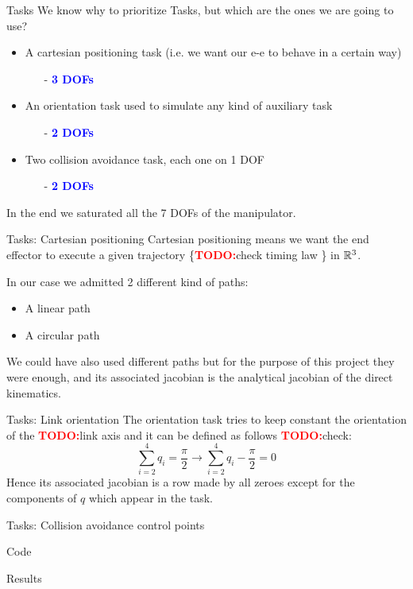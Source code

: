 \documentclass[11pt]{beamer}
\newcommand{\todo}{\textcolor{red}{\textbf{TODO:}}}
\newcommand{\dof}[1]{\begin{itemize}
\item[-]\textcolor{blue}{\textbf{#1 DOFs}}
\end{itemize}}
\begin{document}
\begin{frame}{Tasks}
We know why to prioritize Tasks, but which are the ones we are going to use?
\begin{itemize}
\item A cartesian positioning task (i.e. we want our e-e to behave in a certain way)
\dof{3}
\item An orientation task used to simulate any kind of auxiliary task
\dof{2}
\item Two collision avoidance task, each one on 1 DOF
\dof{2}
\end{itemize}
In the end we saturated all the 7 DOFs of the manipulator.
\end{frame}

\begin{frame}{Tasks: Cartesian positioning}
Cartesian positioning means we want the end effector to execute a given trajectory \{\todo check timing law \} in $\Bbb R^3$.

In our case we admitted 2 different kind of paths:
\begin{itemize}
\item A linear path
\item A circular path 
\end{itemize}

We could have also used different paths but for the purpose of this project they were enough, and its associated jacobian is the analytical jacobian of the direct kinematics.
\end{frame}

\begin{frame}{Tasks: Link orientation}
The orientation task tries to keep constant the orientation of the \todo link axis and it can be defined as follows \todo check:
\begin{equation*}
\sum_{i = 2}^4 q_i = \frac{\pi}{2}\longrightarrow \sum_{i = 2}^4 q_i - \frac{\pi}{2} = 0
\end{equation*}
Hence its associated jacobian is a row made by all zeroes except for the components of $q$ which appear in the task.
\end{frame}

\begin{frame}{Tasks: Collision avoidance control points}

\end{frame}

\begin{frame}{Code}

\end{frame}

\begin{frame}{Results}

\end{frame}
\end{document}
